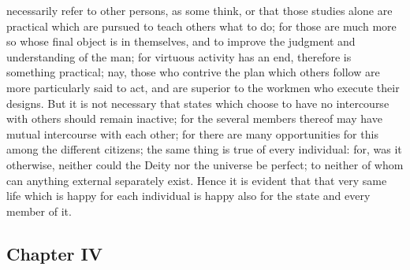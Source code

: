 \documentclass[12pt]{article}
\begin{document}
necessarily refer to other persons, as some think, or that those studies alone are practical which are pursued to teach others what to do; for those are much more so whose final object is in themselves, and to improve the judgment and understanding of the man; for virtuous activity has an end, therefore is something practical; nay, those who contrive the plan which others follow are more particularly said to act, and are superior to the workmen who execute their designs. But it is not necessary that states which choose to have no intercourse with others should remain inactive; for the several members thereof may have mutual intercourse with each other; for there are many opportunities for this among the different citizens; the same thing is true of every individual: for, was it otherwise, neither could the Deity nor the universe be perfect; to neither of whom can anything external separately exist. Hence it is evident that that very same life which is happy for each individual is happy also for the state and every member of it.

\subsection*{Chapter IV}
\end{document}
